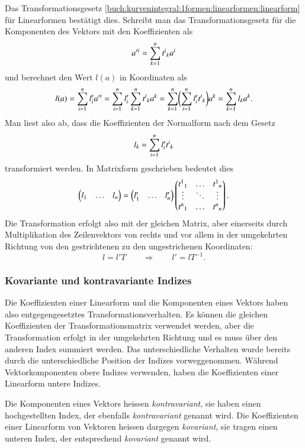 Das Transformationsgesetz
\eqref{buch:kurvenintegral:1formen:linearformen:linearform}
für Linearformen bestätigt dies.
Schreibt man das Transformationsgesetz für die Komponenten des
Vektors mit den Koeffizienten als
\[
a^{\prime i}
=
\sum_{k=1}^n t^i\mathstrut_k a^i
\]
und berechnet den Wert $l(a)$ in Koordinaten als
\[
l(a)
=
\sum_{i=1}^n l'_i a^{\prime i}
=
\sum_{i=1}^n
l'_i
\sum_{k=1}^n
t^i\mathstrut_k a^k
=
\sum_{k=1}^n
\biggl(
\sum_{i=1}^n
l'_i
t^i\mathstrut_k
\biggl)
a^k
=
\sum_{k=1}^n
l_k
a^k.
\]
Man liest also ab, dass die Koeffizienten der Normalform nach dem
Gesetz
\[
l_k
=
\sum_{i=1}^n
l'_i
t^i\mathstrut_k
\]
transformiert werden.
In Matrixform geschrieben bedeutet dies
\[
\begin{pmatrix}l_1&\dots&l_n\end{pmatrix}
=
\begin{pmatrix}l_1'&\dots&l_n'\end{pmatrix}
\begin{pmatrix}
t^1\mathstrut_1 & \dots  & t^1\mathstrut_n \\[-3pt]
\vdots          & \ddots & \vdots          \\
t^n\mathstrut_1 & \dots  & t^n\mathstrut_n
\end{pmatrix}.
\]
Die Transformation erfolgt also mit der gleichen Matrix, aber
einerseits durch Multiplikation des Zeilenvektors von rechts
und vor allem in der umgekehrten Richtung von den gestrichtenen
zu den ungestrichenen Koordinaten:
\[
l = l' T
\qquad\Rightarrow\qquad l' = lT^{-1}.
\]

%
%
\subsubsection{Kovariante und kontravariante Indizes}
Die Koeffizienten einer Linearform und die Komponenten eines Vektors 
haben also entgegengesetztes Transformationsverhalten.
Es können die gleichen Koeffizienten der Transformationsmatrix 
verwendet werden, aber die Transformation erfolgt in der umgekehrten
Richtung und es muss über den anderen Index summiert werden.
Das unterschiedliche Verhalten wurde bereits durch die unterschiedliche
Position der Indizes vorweggenommen.
Während Vektorkomponenten obere Indizes verwenden, haben die
Koeffizienten einer Linearform untere Indizes.

\begin{definition}
Die Komponenten eines Vektors heissen \emph{kontravariant}, sie haben
%
einen hochgestellten Index, der ebenfalls \emph{kontravariant} genannt
wird.
Die Koeffizienten einer Linearform von Vektoren heissen dargegen
{\em kovariant}, sie tragen einen unteren Index, der entsprechend
%
{\em kovariant} genannt wird.
\end{definition}

